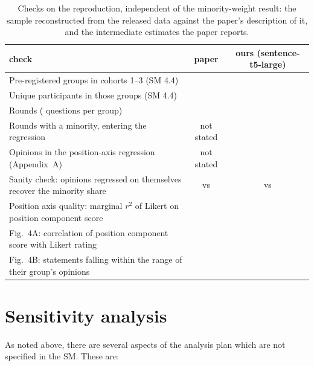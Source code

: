 \documentclass[11pt,a4paper]{article}
\begin{document}
\begin{table}[h]
\centering
\small
\caption{Checks on the reproduction, independent of the minority-weight result: the sample
reconstructed from the released data against the paper's description of it, and the intermediate
estimates the paper reports.}
\label{tab:validation}
\begin{tabular}{p{7.4cm}cc}
\toprule
check & paper & ours (sentence-t5-large) \\
\midrule
Pre-registered groups in cohorts 1--3 (SM 4.4) & \paperNGroups{} & \groupNGroups{} \\
Unique participants in those groups (SM 4.4) & \paperNParticipants{} & \groupNParticipants{} \\
Rounds (\paperRoundsPerGroup{} questions per group) & \paperNRounds{} & \groupNRounds{} \\
Rounds with a minority, entering the regression & not stated & \oursNRoundsLarge{} \\
Opinions in the position-axis regression (Appendix~A) & not stated & \oursMixedNLarge{} \\
\midrule
Sanity check: opinions regressed on themselves recover the minority share & \paperOpinions{} vs \paperShare{} & \oursOpinionsLarge{} vs \oursShareLarge{} \\
Position axis quality: marginal $r^2$ of Likert on position component score & \paperMarginalRsq{} & \oursMarginalRsqLarge{} \\
Fig.\ 4A: correlation of position component score with Likert rating & \paperFigAr{} & \oursFigArLarge{} \\
Fig.\ 4B: statements falling within the range of their group's opinions & \paperFigBwithin{} & \oursFigBwithinLarge{} \\
\bottomrule
\end{tabular}
\end{table}

\section*{Sensitivity analysis}
\label{sec:sensitivity}

As noted above, there are several aspects of the analysis plan which are not specified in the SM.
These are:
\end{document}
